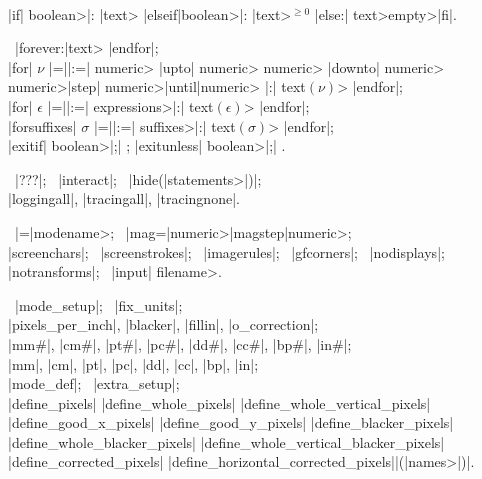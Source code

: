 \medbreak\textindent{}\\
|if| \<boolean>|: |\<text> \bb|elseif|\<boolean>|: |\<text>\ee$^{\ge0}$%
\bb|else:| \<text>\cr\<empty>\ee|fi|.

\smallbreak\textindent{} \ |forever:|\<text> |endfor|;\\
|for| $\nu$ \bb|=|\cr|:=|\ee
\bb\<numeric> |upto| \<numeric>\cr
 \<numeric> |downto| \<numeric>\cr
 \<numeric>\thinspace|step|\thinspace
  \<numeric>\thinspace|until|\thinspace\<numeric>\ee
|:| \<text$(\nu)$> |endfor|;\\
|for| $\epsilon$ \bb|=|\cr|:=|\ee
 \<expressions>|:| \<text$(\epsilon)$> |endfor|;\\
|forsuffixes| $\sigma$ \bb|=|\cr|:=|\ee
 \<suffixes>|:| \<text$(\sigma)$> |endfor|;\\
|exitif| \<boolean>|;| ; \quad
|exitunless| \<boolean>|;| .

\medbreak\textindent{} \
|???|; \ |interact|; \
|hide(|\<statements>|)|;\\
|loggingall|, |tracingall|, |tracingnone|.

\textindent{} \
|\mode=|\<modename>; \ |mag=|\bb\<numeric>\cr|magstep|\<numeric>\ee;\\
|screenchars|; \ |screenstrokes|; \ |imagerules|; \ |gfcorners|; \
|nodisplays|;\\
|notransforms|; \ |input| \<filename>.

\medbreak\textindent\bull {\it ^{Conversion to pixel units}:\/} \
|mode_setup|; \ |fix_units|;\\
|pixels_per_inch|, |blacker|, |fillin|, |o_correction|;\\
|mm#|, |cm#|, |pt#|, |pc#|, |dd#|, |cc#|, |bp#|, |in#|;\\
|mm|, |cm|, |pt|, |pc|, |dd|, |cc|, |bp|, |in|;\\
|mode_def|; \ |extra_setup|;\\
\bb|define_pixels|\cr
|define_whole_pixels|\cr
|define_whole_vertical_pixels|\cr
|define_good_x_pixels|\cr
|define_good_y_pixels|\cr
|define_blacker_pixels|\cr
|define_whole_blacker_pixels|\cr
|define_whole_vertical_blacker_pixels|\cr
|define_corrected_pixels|\cr
|define_horizontal_corrected_pixels|\ee|(|\<names>|)|.

